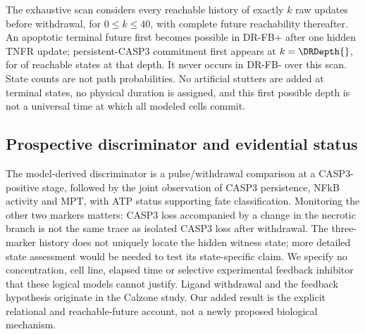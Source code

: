 The exhaustive scan considers every reachable history of exactly $k$ raw
updates before withdrawal, for $0\leq k\leq40$, with complete future
reachability thereafter. An apoptotic terminal future first becomes possible
in DR-FB+ after one hidden TNFR update; persistent-CASP3 commitment first appears
at $k=\DRDepth{}$, for \DRFirstCommitted{} of \DRDepthStates{} reachable
states at that depth. It never occurs in DR-FB- over this scan. State counts
are not path probabilities. No artificial stutters are added at terminal
states, no physical duration is assigned, and this first possible depth is
not a universal time at which all modeled cells commit.

\subsection{Prospective discriminator and evidential status}

The model-derived discriminator is a pulse/withdrawal comparison at a
CASP3-positive stage, followed by the joint observation of CASP3 persistence,
NFkB activity and MPT, with ATP status supporting fate classification.
Monitoring the other two markers matters: CASP3 loss accompanied by a change
in the necrotic branch is not the same trace as isolated CASP3 loss after
withdrawal. The three-marker history does not uniquely locate the hidden
witness state; more detailed state assessment would be needed to test its
state-specific claim. We specify no concentration, cell line, elapsed time or
selective experimental feedback inhibitor that these logical models cannot
justify. Ligand withdrawal and the feedback hypothesis originate in the
Calzone study.\cite{Calzone2010} Our added result is the explicit relational
and reachable-future account, not a newly proposed biological mechanism.

